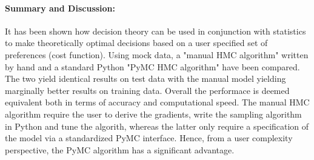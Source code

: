 \begin{example}
	
	\paragraph{Summary and Discussion:} It has been shown how decision theory can be used in conjunction with statistics to make theoretically optimal decisions based on a user specified set of preferences (cost function). Using mock data, a "manual HMC algorithm" written by hand and a standard Python "PyMC HMC algorithm" have been compared. The two yield identical results on test data with the manual model yielding marginally better results on training data. Overall the performace is deemed equivalent both in terms of accuracy and computational speed. The manual HMC algorithm require the user to derive the gradients, write the sampling algorithm in Python and tune the algorith, whereas the latter only require a specification of the model via a standardized PyMC interface. Hence, from a user complexity perspective, the PyMC algorithm has a significant advantage.
\end{example}